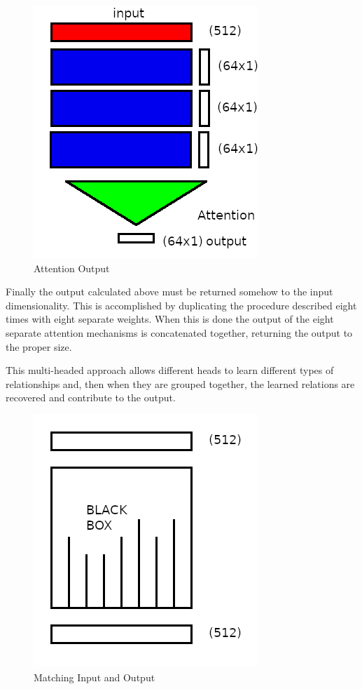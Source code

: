 \begin{figure}[H]
	\begin{center}
		
		
		\includegraphics[scale=0.5]{diagram-mat04-64}
	\end{center}
	\caption[Attention Output]{Attention Output}
	
	\label{attantion-7}
\end{figure}




Finally the output calculated above must be returned somehow to the input dimensionality. This is accomplished by duplicating the procedure described eight times with eight separate weights. When this is done the output of the eight separate attention mechanisms is concatenated together, returning the output to the proper size.

This multi-headed approach allows different heads to learn different types of relationships and, then when they are grouped together, the learned relations are recovered and contribute to the output.

\begin{figure}[H]
	\begin{center}
		
	
	\includegraphics[scale=0.5]{diagram-mat02}
\end{center}
	\caption[Matching Input and Output]{Matching Input and Output}
	\label{attention-matching}

\end{figure}


